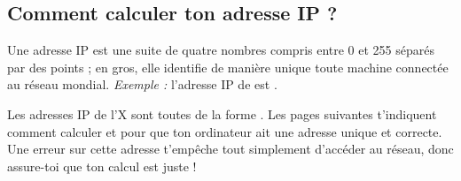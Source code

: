 \subsection{Comment calculer ton adresse IP ?}

\label{calcul_ip}

Une adresse IP est une suite de quatre nombres compris entre 0 et
255 s\'epar\'es par des points ; en gros, elle identifie de mani\`ere
unique toute machine connect\'ee au r\'eseau mondial. \emph{Exemple :}
l'adresse IP de  est .

Les adresses IP de l'X sont toutes de la forme .
Les pages suivantes t'indiquent comment calculer  et  pour que ton
ordinateur ait une adresse unique et correcte. Une erreur sur cette adresse t'emp\^eche tout simplement d'acc\'eder au r\'eseau, donc assure-toi que ton calcul est juste !

